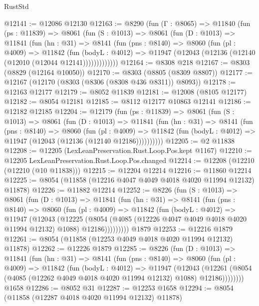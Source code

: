 \begin{lexlean}{RustStd}
\begin{coremodule}
@12141 := @12086 @12130
@12163 := @8290
    (fun (Γ : @8065) =>
    @11840
      (fun (ps : @11839) =>
      @8061
        (fun (S : @1013) =>
        @8061
          (fun (D : @1013) =>
          @11841
            (fun (hn : @31) =>
            @8141
              (fun (pns : @8140) =>
              @8060
                (fun (pl : @4009) =>
                @11842
                  (fun (bodyL : @4012) =>
                  @11947 (@12043 (@12136 (@12140 (@12010 (@12044 @12141)))))))))))))
@12164 := @8308 @218
@12167 := @8303 (@8829 (@12164 @10050))
@12170 := @8303 (@8805 (@8309 @8807))
@12177 := @12167 (@12170 (@8303 (@8306 (@8308 @436 @8311)) @8093))
@12178 := @12163 @12177
@12179 := @8052 @11839
@12181 := @12008 (@8105 @12177)
@12182 := @8054 @12181
@12185 := @8112 @12177 @10863 @12141
@12186 := @12182 @12185
@12204 := @12179
    (fun (ps : @11839) =>
    @8061
      (fun (S : @1013) =>
      @8061
        (fun (D : @1013) =>
        @11841
          (fun (hn : @31) =>
          @8141
            (fun (pns : @8140) =>
            @8060
              (fun (pl : @4009) =>
              @11842 (fun (bodyL : @4012) => @11947 (@12043 (@12136 (@12140 @12186))))))))))
@12205 := @2 @11838
@12208 := @12205 (LexLeanPreservation.Rust.Loop.Pos.kept @1167)
@12210 := @12205 LexLeanPreservation.Rust.Loop.Pos.changed
@12214 := @12208 (@12210 (@12210 (@10 @11838)))
@12215 := @12204 @12214
@12216 := @11860 @12214
@12225 := @8054 (@11858 (@12216 @4047 @4049 @4018 @4020 @11994 @12132) @11878)
@12226 := @11882 @12214
@12252 := @8226
    (fun (S : @1013) =>
    @8061
      (fun (D : @1013) =>
      @11841
        (fun (hn : @31) =>
        @8141
          (fun (pns : @8140) =>
          @8060
            (fun (pl : @4009) =>
            @11842
              (fun (bodyL : @4012) =>
              @11947
                (@12043
                  (@12225
                    (@8054
                      (@4085 (@12226 @4047 @4049 @4018 @4020 @11994 @12132) @1088)
                      @12186)))))))))
    @1879
@12253 := @12216 @1879
@12261 := @8054 (@11858 (@12253 @4049 @4018 @4020 @11994 @12132) @11878)
@12262 := @12226 @1879
@12285 := @8226
    (fun (D : @1013) =>
    @11841
      (fun (hn : @31) =>
      @8141
        (fun (pns : @8140) =>
        @8060
          (fun (pl : @4009) =>
          @11842
            (fun (bodyL : @4012) =>
            @11947
              (@12043
                (@12261 (@8054 (@4085 (@12262 @4049 @4018 @4020 @11994 @12132) @1088) @12186))))))))
    @1658
@12286 := @8052 @31
@12287 := @12253 @1658
@12294 := @8054 (@11858 (@12287 @4018 @4020 @11994 @12132) @11878)

\end{coremodule}
\end{lexlean}
